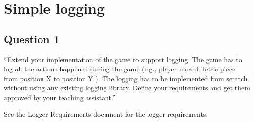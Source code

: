 \chapter{Simple logging}

\section{Question 1}

``Extend your implementation of the game to support logging. The game has to log all the actions
happened during the game (e.g., player moved Tetris piece from position X to position Y ). The
logging has to be implemented from scratch without using any existing logging library. Define your
requirements and get them approved by your teaching assistant.''

See the Logger Requirements document for the logger requirements.